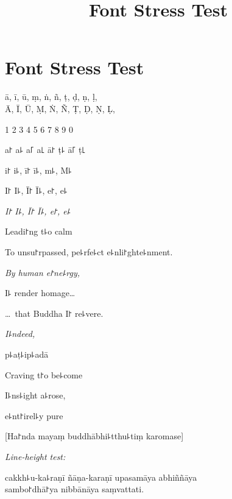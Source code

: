 \documentclass[ babelLanguage=english, final, ]{chantingbook}
\title{Font Stress Test}
\begin{document}
\mainmatter

\chapter{Font Stress Test}

\begin{multicols}{2}

ā, ī, ū, ṃ, ṅ, ñ, ṭ, ḍ, ṇ, ḷ,\\
Ā, Ī, Ū, Ṃ, Ṅ, Ñ, Ṭ, Ḍ, Ṇ, Ḷ,

\columnbreak

1 2 3 4 5 6 7 8 9 0

\end{multicols}

\begin{multicols}{2}

a꜓ a꜕ a꜒ a꜖ ā꜓ ṭ꜕ ā꜒ ṭ꜖

i꜓ i꜕, ī꜓ ī꜕, m꜕, M꜕

I꜓ I꜕, Ī꜓ Ī꜕, e꜓, e꜕

\textit{I꜓ I꜕, Ī꜓ Ī꜕, e꜓, e꜕}

Leadi꜓ng t꜕o calm

To unsu꜓rpassed, pe꜕rfe꜕ct e꜕nli꜓ghte꜕nment.

\textit{By human e꜓ne꜕rgy,}

I꜕ render homage\ldots

\ldots\ that Buddha I꜓ re꜕vere.

\textit{I꜕ndeed,}

p꜕aṭ꜕ip꜕adā

Craving t꜓o be꜕come

I꜕ns꜕ight a꜕rose,

e꜕nt꜓irel꜕y pure

\end{multicols}

[Ha꜓nda mayaṃ buddhābhi꜕tthu꜕tiṃ karomase]

\textit{Line-height test:}

cakkh꜕u-ka꜕raṇī ñāṇa-karaṇī upasamāya abhiññāya\\
sambo꜓dhā꜓ya nibbānāya saṃvattati.

%
%
%
%
\end{document}
